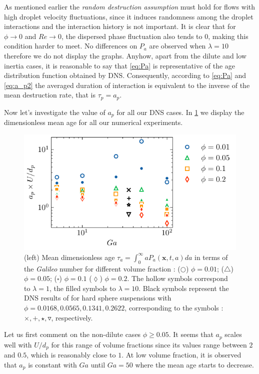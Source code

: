 As mentioned earlier the \textit{random destruction assumption} must hold for flows with high droplet velocity fluctuations, since it induces randomness among the droplet interactions \citep{zhang2023evolution} and the interaction history is not important.  
It is clear that for $\phi \to 0$ and $Re \to 0$, the dispersed phase fluctuation also tends to $0$, making this condition harder to meet. 
No differences on $P_a$ are observed when $\lambda = 10 $ therefore we do not display the graphs. 
Anyhow, apart from the dilute and low inertia cases, it is reasonable to say that \ref{eq:Pa} is representative of the age distribution function obtained by DNS.
Consequently, according to \ref{eq:Pa} and \ref{eq:a_p2} the averaged duration of interaction is equivalent to the inverse of the mean destruction rate, that is $\tau_p = a_p$. 

Now let's investigate the value of $a_p$ for all our DNS cases. 
In \ref{fig:tau_p} we display the dimensionless mean age for all our numerical experiments. 
\begin{figure}[h!]
    \centering
    \includegraphics[height = 0.3\textwidth]{image/HOMOGENEOUS_NEW/PA/age.pdf}
    \caption{
    (left) Mean dimensionless age $\tau_a =  \int_0^\infty aP_a(\textbf{x},t,a)da$ in terms of the \textit{Galileo} number for different volume fraction :   
    ($\pmb\bigcirc$) $\phi = 0.01$; ($\pmb\triangle$) $ \phi = 0.05$; ($\pmb\square$) $\phi = 0.1$ ($\pmb\lozenge$) $\phi = 0.2$.
    The hollow symbols correspond to $\lambda = 1$, the filled symbols to $\lambda = 10$.
    Black symbols represent the DNS results of \citet{zhang2023evolution} for hard sphere suspensions with $\phi = 0.0168,0.0565,0.1341,0.2622$, corresponding to the symbols : $\pmb\times, \pmb +, \pmb\star , \pmb\triangledown$, respectively.
    }
    \label{fig:tau_p}
\end{figure}
Let us first comment on the non-dilute cases $\phi\geq 0.05$. 
It seems that $a_p$ scales well with $U/d_p$ for this range of volume fractions since its values range between $2$ and $0.5$, which is reasonably close to $1$. 
At low volume fraction, it is observed that $a_p$ is constant with $Ga$ until $Ga = 50$ where the mean age starts to decrease. 


